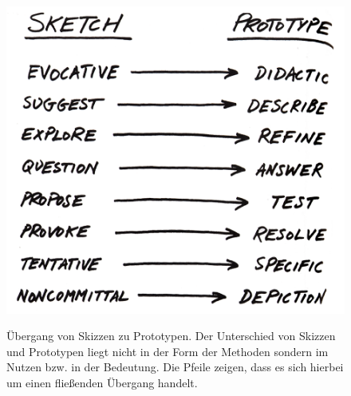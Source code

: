 \begin{figure}
	\begin{center}
        {\includegraphics[width=.9\linewidth]{gfx/buxtonSketch2prototype}}
	\end{center}
		\caption[Übergang von Skizzen zu Prototypen. \newline \citep{Buxton:2007}]{Übergang von Skizzen zu Prototypen. Der Unterschied von Skizzen und Prototypen liegt nicht in der Form der Methoden sondern im Nutzen bzw. in der Bedeutung. Die Pfeile zeigen, dass es sich hierbei um einen fließenden Übergang handelt.}\label{fig:buxtonSketch2prototype}
\end{figure}

